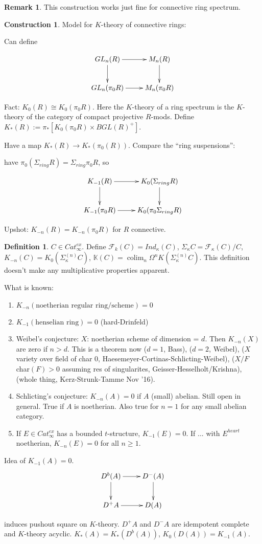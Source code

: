 \documentclass[letterpaper]{article}
\theoremstyle{definition}
\newtheorem{definition}[lemma]{Definition}
\newtheorem{remark}[lemma]{Remark}
\newtheorem{construction}{Construction}
\newcommand{\mbb}{\mathbb}
\newcommand{\mc}{\mathcal}
\DeclareMathOperator*{\colim}{colim}
\begin{document}
\begin{remark}
This construction works just fine for connective ring spectrum. 
\end{remark}

\begin{construction}
Model for $K$-theory of connective rings: 

Can define

\[
\xymatrix{GL_n(R) \ar[r]\ar[d] & M_n(R) \ar[d] \\ GL_n(\pi_0R) \ar[r]
  & M_n(\pi_0R)}
\]

Fact: $K_0(R) \cong K_0(\pi_0 R)$. Here the $K$-theory of a ring
spectrum is the $K$-theory of the category of compact projective $R$-mods.
Define $K_*(R) := \pi_*[K_0(\pi_0R) \times BGL(R)^+]$.

Have a map $K_*(R) \rightarrow K_*(\pi_0(R))$. Compare the ``ring
suspensions'':

have $\pi_0(\Sigma_{ring} R) = \Sigma_{ring} \pi_0R$, so 

\[
\xymatrix{K_{-1}(R) \ar[r]\ar[d] & K_0(\Sigma_{ring}R)
\ar[d]\\K_{-1}(\pi_0R) \ar[r] &K_0(\pi_0\Sigma_{ring}R)}
\]

Upshot: $K_{-n}(R) = K_{-n}(\pi_0R)$ for $R$ connective. 
\end{construction}

\begin{definition}
$C \in Cat_{\infty}^{ex}$. Define $\mc F_k(C) = Ind_\kappa(C)$,
$\Sigma_\kappa C = \mc F_\kappa (C)/C$, $K_{-n}(C) =
K_0(\Sigma_\kappa^{(n)} C)$, $\mbb K(C) = \colim_n \Omega^n
K(\Sigma^{(n)}_\kappa C)$. This definition doesn't make any
multiplicative properties apparent. 
\end{definition}

What is known:

\begin{enumerate}
\item $K_{-n}(\text{noetherian regular ring/scheme}) = 0$
\item $K_{-1}(\text{henselian ring}) = 0$ (hard-Drinfeld)
\item Weibel's conjecture: $X$: noetherian scheme of dimension =
  $d$. Then $K_{-n}(X)$ are zero if $n > d$. This is a theorem now ($d
  = 1$, Bass), ($d = 2$, Weibel), ($X$ variety over field of char 0,
  Haesemeyer-Cortinas-Schlicting-Weibel), ($X/F$ char$(F) > 0$
  assuming res of singularites, Geisser-Hesselholt/Krishna), (whole
  thing, Kerz-Strunk-Tamme Nov '16).
\item Schlicting's conjecture: $K_{-n}(A) = 0$ if $A$ (small)
  abelian. Still open in general. True if $A$ is noetherian. Also true
  for $n = 1$ for any small abelian category. 
\item If $E \in Cat_\infty^{ex}$ has a bounded $t$-structure,
  $K_{-1}(E) = 0$. If ... with $E^{heart}$ noetherian, $K_{-n}(E) =
  0$ for all $n \geq 1$. 
\end{enumerate}

Idea of $K_{-1}(A) = 0$. 
\[
\xymatrix{D^b(A) \ar[r]\ar[d] & D^{-}(A) \ar[d] \\ D^+A \ar[r] & D(A)}
\]

induces pushout square on $K$-theory. $D^+A$ and $D^{-}A$ are
idempotent complete and $K$-theory acyclic. $K_*(A) = K_*(D^b(A))$,
$K_0(D(A)) = K_{-1}(A)$. 
\end{document}
